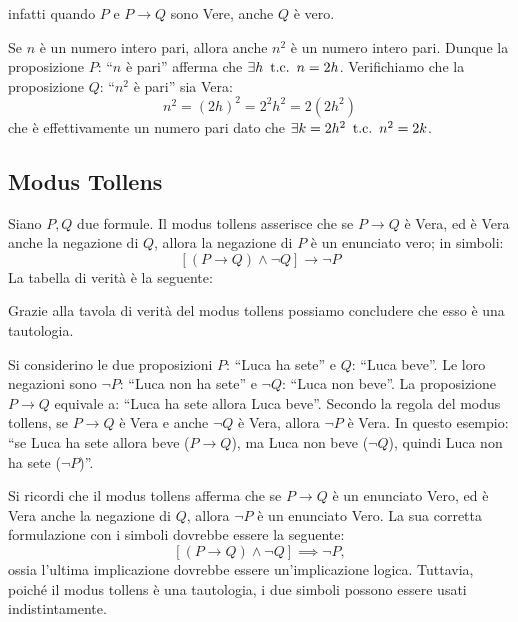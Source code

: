 \noindent infatti quando \(P\) e \(P \longrightarrow Q\) sono Vere, anche \(Q\) è vero.

\begin{example}
    Se \(n\) è un numero intero pari, allora anche \(n^2\) è un numero intero pari.
    Dunque la proposizione \(P\): ``\(n\) è pari'' afferma che \(\exists h \mathrm{\hspace*{.5em}t.c.\hspace*{.5em}} n = 2h\). Verifichiamo che la proposizione \(Q\): ``\(n^2\) è pari'' sia Vera:
    \[
        n^2 = {\left(2h\right)}^2
            = 2^2 h^2
            = 2 \left(2h^2\right)
    \]
    che è effettivamente un numero pari dato che \(\exists k = 2h^2 \mathrm{\hspace*{.5em}t.c.\hspace*{.5em}} n^2 = 2k\).
\end{example}


\subsection{Modus Tollens}\label{subsec:modus_tollens}
Siano \(P, Q\) due formule. Il modus tollens asserisce che se \(P \longrightarrow Q\) è Vera, ed è Vera anche la negazione di \(Q\), allora la negazione di \(P\) è un enunciato vero; in simboli:
\[
    \left[(P \longrightarrow Q) \land \neg Q\right] \longrightarrow \neg P
\]
La tabella di verità è la seguente:

Grazie alla tavola di verità del modus tollens possiamo concludere che esso è una tautologia.
\begin{example}
    Si considerino le due proposizioni \(P\): ``Luca ha sete'' e \(Q\): ``Luca beve''. Le loro negazioni sono \(\neg P\): ``Luca non ha sete'' e \(\neg Q\): ``Luca non beve''. La proposizione \(P \longrightarrow Q\) equivale a: ``Luca ha sete allora Luca beve''. Secondo la regola del modus tollens, se \(P \longrightarrow Q \) è Vera e anche \(\neg Q\) è Vera, allora \(\neg P\) è Vera. In questo esempio: ``se Luca ha sete allora beve (\(P \longrightarrow Q\)), ma Luca non beve (\(\neg Q\)), quindi Luca non ha sete (\(\neg P\))''.
\end{example}

\begin{remark}
    Si ricordi che il modus tollens afferma che se \(P \longrightarrow Q\) è un enunciato Vero, ed è Vera anche la negazione di \(Q\), allora \(\neg P\) è un enunciato Vero.
    La sua corretta formulazione con i simboli dovrebbe essere la seguente:
    \[
        [(P \longrightarrow Q) \land \neg Q] \implies \neg P,
    \]
    ossia l'ultima implicazione dovrebbe essere un'implicazione logica. Tuttavia, poiché il modus tollens è una tautologia, i due simboli possono essere usati indistintamente.
\end{remark}


